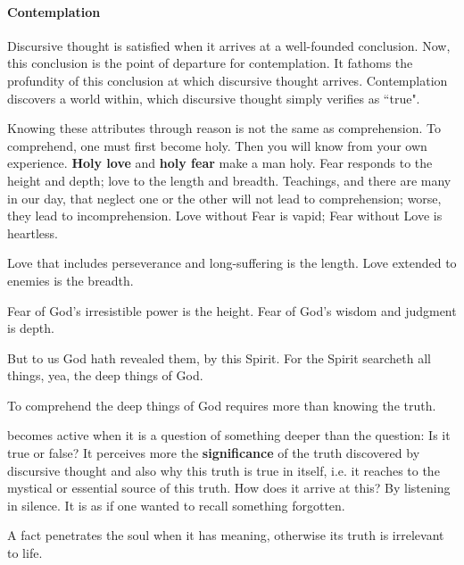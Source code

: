 \paragraph{Contemplation}
\begin{quotex}
Discursive thought is satisfied when it arrives at a well-founded conclusion. Now, this conclusion is the point of departure for contemplation. It fathoms the profundity of this conclusion at which discursive thought arrives. Contemplation discovers a world within, which discursive thought simply verifies as ``true". 

\end{quotex}
Knowing these attributes through reason is not the same as comprehension. To comprehend, one must first become holy. Then you will know from your own experience. \textbf{Holy love} and \textbf{holy fear} make a man holy. Fear responds to the height and depth; love to the length and breadth. Teachings, and there are many in our day, that neglect one or the other will not lead to comprehension; worse, they lead to incomprehension. Love without Fear is vapid; Fear without Love is heartless.

Love that includes perseverance and long-suffering is the length. Love extended to enemies is the breadth.

Fear of God's irresistible power is the height. Fear of God's wisdom and judgment is depth.

\begin{quotex}
But to us God hath revealed them, by this Spirit. For the Spirit searcheth all things, yea, the deep things of God. 

\end{quotex}
To comprehend the deep things of God requires more than knowing the truth.

\begin{quotex}
[Contemplation] becomes active when it is a question of something deeper than the question: Is it true or false? It perceives more the \textbf{significance} of the truth discovered by discursive thought and also why this truth is true in itself, i.e. it reaches to the mystical or essential source of this truth. How does it arrive at this? By listening in silence. It is as if one wanted to recall something forgotten. 

\end{quotex}
A fact penetrates the soul when it has meaning, otherwise its truth is irrelevant to life.

